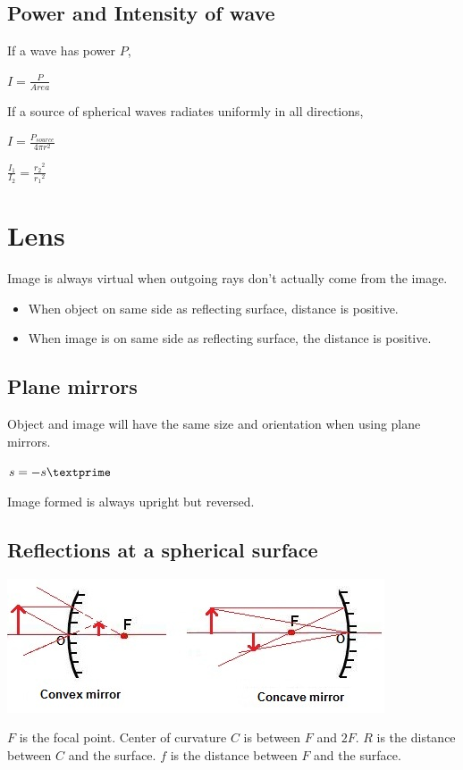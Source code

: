 \documentclass[a4paper]{article}
\begin{document}
\subsection{Power and Intensity of wave}
If a wave has power $P$,
\begin{center}
$I = \displaystyle\frac{P}{Area}$
\end{center}
If a source of spherical waves radiates uniformly in all directions,
\begin{center}
$I = \displaystyle\frac{P_{source}}{4\pi r^2}$
\end{center}
\begin{center}
$\displaystyle \frac{I_1}{I_2} = \frac{{r_2}^2}{{r_1}^2}$
\end{center}
\section{Lens}
Image is always virtual when outgoing rays don't actually come from the image.
\begin{itemize}
\item When object on same side as reflecting surface, distance is positive.
\item When image is on same side as reflecting surface, the distance is positive.
\end{itemize}
\subsection{Plane mirrors}
Object and image will have the same size and orientation when using plane mirrors.
\begin{center}
$s = -s\textprime$
\end{center}
Image formed is always upright but reversed.

\subsection{Reflections at a spherical surface}
\begin{center}
  \includegraphics[width=10 cm]{curvedmirrors.jpeg}
\end{center}
$F$ is the focal point. Center of curvature $C$ is between $F$ and $2F$. $R$ is the distance between $C$ and the surface. $f$ is the distance between $F$ and the surface.
\end{document}
